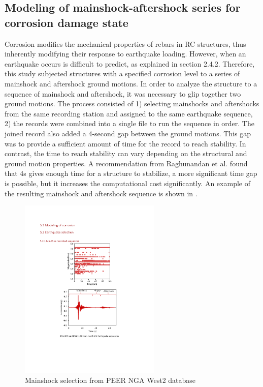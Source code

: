\subsection{Modeling of mainshock-aftershock series for corrosion damage state}

Corrosion modifies the mechanical properties of rebars in RC structures, thus inherently modifying their response to earthquake loading. However, when an earthquake occurs is difficult to predict, as explained in section 2.4.2. Therefore, this study subjected structures with a specified corrosion level to a series of mainshock and aftershock ground motions. 
In order to analyze the structure to a sequence of mainshock and aftershock, it was necessary to glip together two ground motions. The process consisted of 1) selecting mainshocks and aftershocks from the same recording station and assigned to the same earthquake sequence, 2) the records were combined into a single file to run the sequence in order. The joined record also added a 4-second gap between the ground motions. This gap was to provide a sufficient amount of time for the record to reach stability. In contrast, the time to reach stability can vary depending on the structural and ground motion properties. A recommendation from Raghunandan et al. \cite{Raghunandan2015} found that 4s gives enough time for a structure to stabilize, a more significant time gap is possible, but it increases the computational cost significantly. An example of the resulting mainshock and aftershock sequence is shown in .

\begin{figure}[htbp]
	\centering
	\includegraphics[width=0.6\textwidth]{Chapter-5/figs/MS_AS_Figure.pdf}
	\caption{Mainshock selection from PEER NGA West2 database}
	\label{fig:MS-AS_sequence_sample}
\end{figure}

